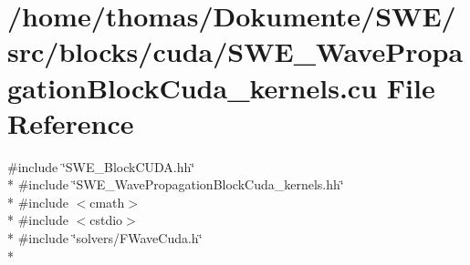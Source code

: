 \hypertarget{SWE__WavePropagationBlockCuda__kernels_8cu}{\section{/home/thomas/\-Dokumente/\-S\-W\-E/src/blocks/cuda/\-S\-W\-E\-\_\-\-Wave\-Propagation\-Block\-Cuda\-\_\-kernels.cu File Reference}
\label{SWE__WavePropagationBlockCuda__kernels_8cu}
}
{\ttfamily \#include \char`\"{}S\-W\-E\-\_\-\-Block\-C\-U\-D\-A.\-hh\char`\"{}}\\*
{\ttfamily \#include \char`\"{}S\-W\-E\-\_\-\-Wave\-Propagation\-Block\-Cuda\-\_\-kernels.\-hh\char`\"{}}\\*
{\ttfamily \#include $<$cmath$>$}\\*
{\ttfamily \#include $<$cstdio$>$}\\*
{\ttfamily \#include \char`\"{}solvers/\-F\-Wave\-Cuda.\-h\char`\"{}}\\*

